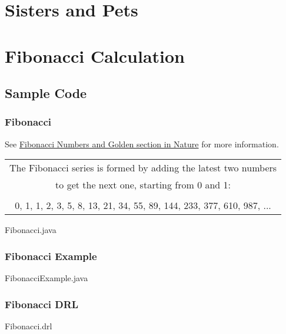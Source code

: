\chapter{Sisters and Pets}

\chapter{Fibonacci Calculation}
\section {Sample Code}
\subsection {Fibonacci}
See \href{http://www.mcs.surrey.ac.uk/Personal/R.Knott/Fibonacci/fibnat.html}{Fibonacci Numbers and Golden section in Nature} for more information.  
\\
\begin {tabular}{|c|}
\hline
The Fibonacci series is formed by adding the latest two numbers\\
to get the next one, starting from 0 and 1:\\
\\
0, 1, 1, 2, 3, 5, 8, 13, 21, 34, 55, 89, 144, 233, 377, 610, 987, ...\\ 
\hline
\end {tabular}

\clearpage
{} {Fibonacci.java}

\clearpage
\subsection {Fibonacci Example}
 {FibonacciExample.java}

\clearpage
\subsection {Fibonacci DRL}
 {Fibonacci.drl}





